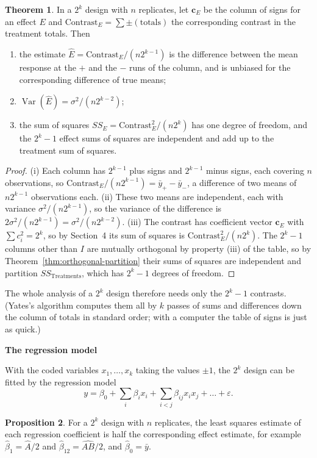 \documentclass[11pt,a4paper]{article}
\numberwithin{equation}{section}
\DeclareMathOperator{\Var}{Var}
\theoremstyle{definition}
\newtheorem{thm}{Theorem}[subsection]
\newtheorem{prop}[thm]{Proposition}
\newcommand{\subhead}[1]{%
  \par\medskip\noindent\textbf{#1}\par\nobreak\smallskip}
\begin{document}
\begin{thm}\label{thm:twok}
In a $2^k$ design with $n$ replicates, let $\mathbf c_E$ be the column of signs for an effect $E$ and $\text{Contrast}_E = \sum\pm(\text{totals})$ the corresponding contrast in the
treatment totals. Then
\begin{enumerate}[label=(\roman*)]
\item the estimate $\hat E = \text{Contrast}_E/(n2^{k-1})$ is the difference between the mean response at the $+$ and the $-$ runs of the column, and is unbiased
for the corresponding difference of true means;
\item $\Var(\hat E) = \sigma^2/(n2^{k-2})$;
\item the sum of squares $SS_E = \text{Contrast}_E^2/(n2^k)$ has one degree of freedom, and the $2^k - 1$ effect sums of squares are independent and add up to
the treatment sum of squares.
\end{enumerate}
\end{thm}

\begin{proof}
(i) Each column has $2^{k-1}$ plus signs and $2^{k-1}$ minus signs, each covering $n$ observations, so $\text{Contrast}_E/(n2^{k-1}) = \bar y_+ - \bar y_-$, a difference of two means
of $n2^{k-1}$ observations each. (ii) These two means are independent, each with variance $\sigma^2/(n2^{k-1})$, so the variance of the difference is
$2\sigma^2/(n2^{k-1}) = \sigma^2/(n2^{k-2})$. (iii) The contrast has coefficient vector $\mathbf c_E$ with $\sum c_i^2 = 2^k$, so by Section~4 its sum of squares is $\text{Contrast}_E^2/(n2^k)$. The $2^k - 1$
columns other than $I$ are mutually orthogonal by property (iii) of the table, so by Theorem~\ref{thm:orthogonal-partition} their sums of squares are independent and
partition $SS_{\mathrm{Treatments}}$, which has $2^k - 1$ degrees of freedom.
\end{proof}

The whole analysis of a $2^k$ design therefore needs only the $2^k - 1$ contrasts. (Yates's algorithm computes them all by $k$ passes of sums and
differences down the column of totals in standard order; with a computer the table of signs is just as quick.)

\subhead{The regression model}
With the coded variables $x_1, \dots, x_k$ taking the values $\pm1$, the $2^k$ design can be fitted by the regression model
\[
y = \beta_0 + \sum_i\beta_ix_i + \sum_{i<j}\beta_{ij}x_ix_j + \dots + \varepsilon .
\]

\begin{prop}\label{prop:half-effect}
For a $2^k$ design with $n$ replicates, the least squares estimate of each regression coefficient is half the corresponding effect estimate, for
example $\hat\beta_1 = \hat A/2$ and $\hat\beta_{12} = \widehat{AB}/2$, and $\hat\beta_0 = \bar y$.
\end{prop}
\end{document}
